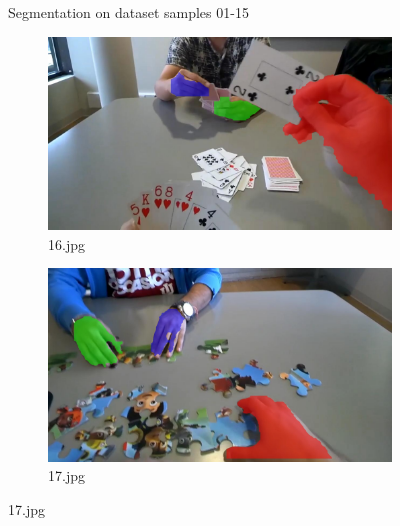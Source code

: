\begin{figure}[!h]
\begin{subfigure}[b]{0.3\textwidth}
    \end{subfigure}

    \caption{Segmentation on dataset samples 01-15}
       
\end{figure}



\begin{figure}[!h]
    \centering

    \begin{subfigure}[b]{0.3 \textwidth}
        \centering
        \includegraphics[width=\textwidth]{images/handSegmentation/16.jpg}
        \caption{16.jpg}
        
    \end{subfigure}
    \hfill
    \begin{subfigure}[b]{0.3\textwidth}
        \centering
        \includegraphics[width=\textwidth]{images/handSegmentation/17.jpg}
        \caption{17.jpg}
        

\end{subfigure}
\end{figure}
